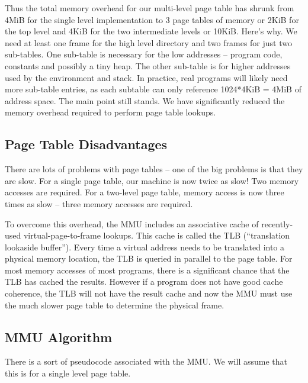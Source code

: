Thus the total memory overhead for our multi-level page table has shrunk from 4MiB for the single level implementation to 3 page tables of memory or 2KiB for the top level and 4KiB for the two intermediate levels or 10KiB.
Here's why.
We need at least one frame for the high level directory and two frames for just two sub-tables.
One sub-table is necessary for the low addresses -- program code, constants and possibly a tiny heap.
The other sub-table is for higher addresses used by the environment and stack.
In practice, real programs will likely need more sub-table entries, as each subtable can only reference 1024*4KiB = 4MiB of address space.
The main point still stands.
We have significantly reduced the memory overhead required to perform page table lookups.

\subsection{Page Table Disadvantages}

There are lots of problems with page tables -- one of the big problems is that they are slow.
For a single page table, our machine is now twice as slow!
Two memory accesses are required.
For a two-level page table, memory access is now three times as slow -- three memory accesses are required.

To overcome this overhead, the MMU includes an associative cache of recently-used virtual-page-to-frame lookups.
This cache is called the TLB (``translation lookaside buffer'').
Every time a virtual address needs to be translated into a physical memory location, the TLB is queried in parallel to the page table.
For most memory accesses of most programs, there is a significant chance that the TLB has cached the results.
However if a program does not have good cache coherence, the TLB will not have the result cache and now the MMU must use the much slower page table to determine the physical frame.

\subsection{MMU Algorithm}

There is a sort of pseudocode associated with the MMU.
We will assume that this is for a single level page table.

